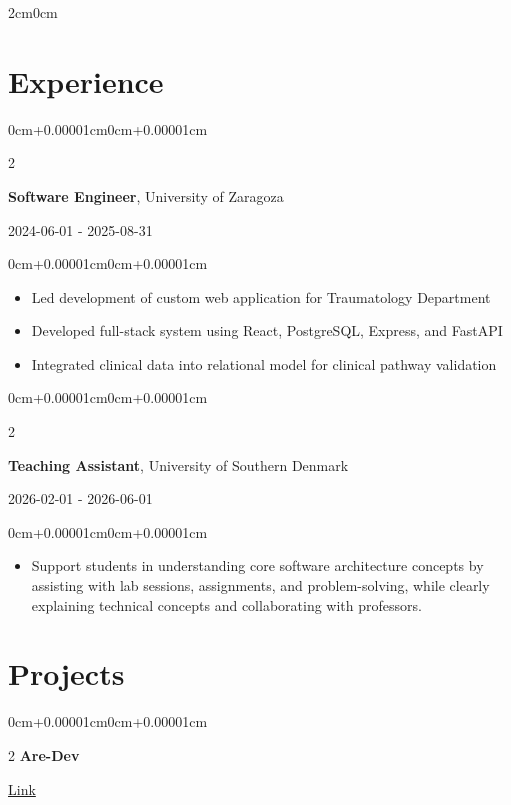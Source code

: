 \documentclass[10pt, a4paper]{article}
\newenvironment{highlights}{
    \begin{itemize}[
        topsep=0.08cm, parsep=0.08cm, partopsep=0pt,
        itemsep=0pt, leftmargin=0cm+10pt
    ]
}{
    \end{itemize}
}
\newenvironment{onecolentry}{
    \begin{adjustwidth}{0cm+0.00001cm}{0cm+0.00001cm}
}{
    \end{adjustwidth}
}
\newenvironment{twocolentry}[2][]{
    \onecolentry
    \def\secondColumn{#2}
    \setcolumnwidth{\fill, 4.5cm}
    \begin{paracol}{2}
}{
    \switchcolumn\raggedleft\small\color{mutedText}\secondColumn
    \end{paracol}
    \endonecolentry
}
\begin{document}
\begin{adjustwidth}{2cm}{0cm}
\vspace{0.10cm}
\section{Experience}
\begin{twocolentry}{2024-06-01 - 2025-08-31}
\textbf{Software Engineer}, University of Zaragoza
\end{twocolentry}

\vspace{0.10 cm}
\begin{onecolentry}
\begin{highlights}
\item Led development of custom web application for Traumatology Department
\item Developed full-stack system using React, PostgreSQL, Express, and FastAPI
\item Integrated clinical data into relational model for clinical pathway validation
\end{highlights}
\end{onecolentry}
\vspace{0.10 cm}
\begin{twocolentry}{2026-02-01 - 2026-06-01}
\textbf{Teaching Assistant}, University of Southern Denmark
\end{twocolentry}

\vspace{0.10 cm}
\begin{onecolentry}
\begin{highlights}
\item Support students in understanding core software architecture concepts by assisting with lab sessions, assignments, and problem-solving, while clearly explaining technical concepts and collaborating with professors.
\end{highlights}
\end{onecolentry}


\vspace{0.10cm}
\section{Projects}
\vspace{0.10 cm}
\begin{twocolentry}{\href{are-dev.es}{Link}}\textbf{Are-Dev}
\end{twocolentry}


\end{adjustwidth}
\end{document}
